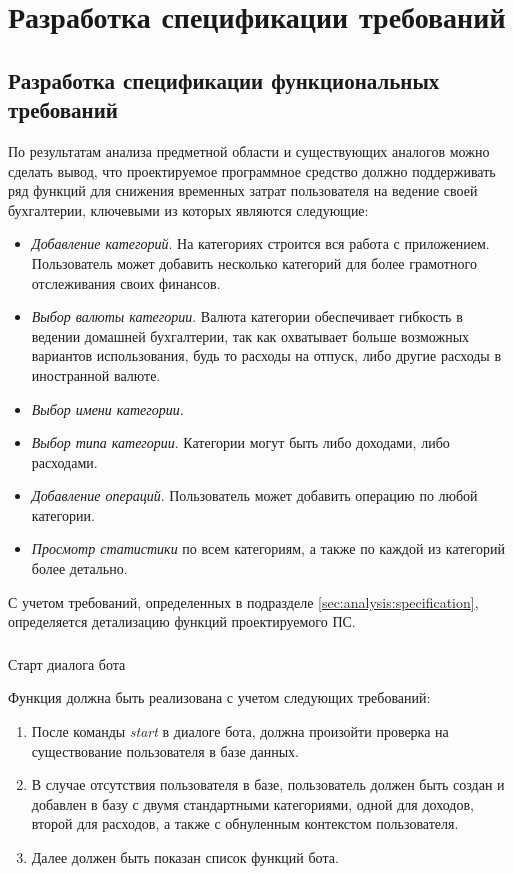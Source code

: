 \section{Разработка спецификации требований}
\label{sec:domain}

\subsection{Разработка спецификации функциональных требований}
\label{sec:domain:specification}

По результатам анализа предметной области и существующих аналогов можно сделать вывод, что проектируемое программное средство должно поддерживать ряд функций для снижения временных затрат пользователя на ведение своей бухгалтерии, ключевыми из которых являются следующие:

\begin{itemize}
	\item \emph{Добавление категорий}. На категориях строится вся работа с приложением. Пользователь может добавить несколько категорий для более грамотного отслеживания своих финансов.
	\item \emph{Выбор валюты категории}. Валюта категории обеспечивает гибкость в ведении домашней бухгалтерии, так как охватывает больше возможных вариантов использования, будь то расходы на отпуск, либо другие расходы в иностранной валюте.
	\item \emph{Выбор имени категории}.
	\item \emph{Выбор типа категории}. Категории могут быть либо доходами, либо расходами.
	\item \emph{Добавление операций}. Пользователь может добавить операцию по любой категории. 
	\item \emph{Просмотр статистики} по всем категориям, а также по каждой из категорий более детально.
\end{itemize}

С учетом требований, определенных в подразделе \ref{sec:analysis:specification}, определяется детализацию функций проектируемого ПС.

\subsubsection{} Старт диалога бота
\label{sec:domain:specification:startdialog}

Функция должна быть реализована с учетом следующих требований:

\begin{enumerate}
	\item После команды \emph{start} в диалоге бота, должна произойти проверка на существование пользователя в базе данных.
	\item В случае отсутствия пользователя в базе, пользователь должен быть создан и добавлен в базу с двумя стандартными категориями, одной для доходов, второй для расходов, а также с обнуленным контекстом пользователя.
	\item Далее должен быть показан список функций бота.
\end{enumerate}

